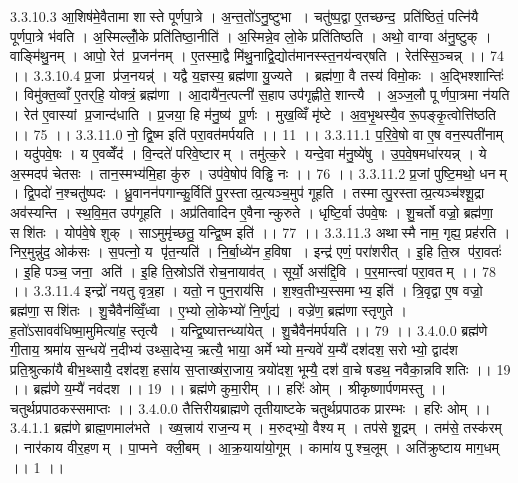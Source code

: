 3.3.10.3
आ॒शिष॑मे॒वैतामा शास्ते पूर्णपा॒त्रे । अ॒न्त॒तो॑ऽनु॒ष्टुभा । चतु॑ष्प॒द्वा ए॒तच्छन्द॒ प्रति॑ष्ठितं॒ पत्नि॑यै पूर्णपा॒त्रे भ॑वति । अ॒स्मिल्लोँ॒के प्रति॑तिष्ठा॒नीति॑ । अ॒स्मिन्ने॒व लो॒के प्रति॑तिष्ठति । अथो॒ वाग्वा अ॑नु॒ष्टुक् । वाङ्मि॑थु॒नम् । आपो॒ रेत॑ प्र॒जन॑नम् । ए॒तस्मा॒द्वै मि॑थु॒नाद्वि॒द्योत॑मानस्स्त॒नय॑न्वर्‌षति । रेत॑स्सि॒ञ्चन्न् ।। 74 ।।
3.3.10.4
प्र॒जा प्र॑ज॒नयन्न्॑ । यद्वै य॒ज्ञस्य॒ ब्रह्म॑णा यु॒ज्यते । ब्रह्म॑णा॒ वै तस्य॑ विमो॒कः । अ॒द्भिश्शान्तिः॑ । विमु॑क्त॒व्वाँ ए॒तर्‌हि॒ योक्त्रं॒ ब्रह्म॑णा । आ॒दायै॑न॒त्पत्नी॑ स॒हाप उप॑गृह्णीते॒ शान्त्यै । अ॒ञ्ज॒लौ पूर्णपा॒त्रमा न॑यति । रेत॑ ए॒वास्यां प्र॒जान्द॑धाति । प्र॒जया॒ हि म॑नु॒ष्य॑ पू॒र्णः । मुख॒व्विँ मृ॑ष्टे । अ॒व॒भृ॒थस्यै॒व रू॒पङ्कृ॒त्वोत्ति॑ष्ठति ।। 75 ।।
3.3.11.0
नो॒ द्वि॒ष्म इति॑ परा॒वत॑मर्पयति ।। 11 ।।
3.3.11.1
प॒रि॒वे॒षो वा ए॒ष वन॒स्पती॑नाम् । यदु॑पवे॒षः । य ए॒वव्वेँद॑ । वि॒न्दते॑ परिवे॒ष्टारम् । तमु॑त्क॒रे । यन्दे॒वा म॑नु॒ष्ये॑षु । उ॒प॒वे॒षमधा॑रयन्न् । ये अ॒स्मदप॑ चेतसः । तान॒स्मभ्य॑मि॒हा कु॑रु । उप॑वे॒षोप॑ विड्ढि नः ।। 76 ।।
3.3.11.2
प्र॒जां पुष्टि॒मथो॒ धनम् । द्वि॒पदो॑ न॒श्चतु॑ष्पदः । ध्रु॒वानन॑पगान्कु॒र्विति॑ पु॒रस्तात्प्र॒त्यञ्च॒मुप॑ गूहति । तस्मात्पु॒रस्तात्प्र॒त्यञ्च॑श्शू॒द्रा अव॑स्यन्ति । स्थ॒वि॒म॒त उप॑गूहति । अप्र॑तिवादिन ए॒वैनान्कुरुते । धृष्टि॒र्वा उ॑पवे॒षः । शु॒चर्तो वज्रो॒ ब्रह्म॑णा॒ सशि॑तः । योप॑वे॒षे शुक् । साऽमुमृ॑च्छतु॒ यन्द्वि॒ष्म इति॑ ।। 77 ।।
3.3.11.3
अथास्मै नाम॒ गृह्य॒ प्रह॑रति । निर॒मुन्नु॑द॒ ओक॑सः । स॒पत्नो॒ य पृ॑त॒न्यति॑ । नि॒र्बा॒ध्ये॑न ह॒विषा । इन्द्र॑ एणं॒ परा॑शरीत् । इ॒हि ति॒स्र प॑रा॒वतः॑ । इ॒हि पञ्च॒ जना॒॒ अति॑ । इ॒हि ति॒स्रोऽति॑ रोच॒नायाव॑त् । सूर्यो॒ अस॑द्दि॒वि । प॒र॒मान्त्वा॑ परा॒वतम् ।। 78 ।।
3.3.11.4
इन्द्रो॑ नयतु वृत्र॒हा । यतो॒ न पुन॒राय॑सि । श॒श्व॒तीभ्य॒स्समाभ्य॒ इति॑ । त्रि॒वृद्वा ए॒ष वज्रो॒ ब्रह्म॑णा॒ सशि॑तः । शु॒चैवैन॑व्विँ॒ध्वा । ए॒भ्यो लो॒केभ्यो॑ नि॒र्णुद्य॑ । वज्रे॑ण॒ ब्रह्म॑णा स्तृणुते । ह॒तो॑ऽसावव॑धिष्मा॒मुमित्या॑ह॒ स्तृत्यै । यन्द्वि॒ष्यात्तन्ध्या॑येत् । शु॒चैवैन॑मर्पयति ।। 79 ।।
3.4.0.0
ब्रह्म॑णे गी॒ताय॒ श्रमा॑य स॒न्धये॑ न॒दीभ्य॑ उथ्सा॒देभ्य॒ ऋत्यै॒ भाया॒ अर्मेभ्यो म॒न्यवे॑ य॒म्यै॑ दश॑दश॒ सरोभ्यो॒ द्वाद॑श प्रति॒श्रुत्का॑यै बीभ॒थ्सायै॒ दश॑दश॒ हसा॑य स॒प्ताख्ष॑रा॒जाय॒ त्रयो॑दश॒ भूम्यै॒ दश॑ वा॒चे षडथ॒ नवैका॒न्नवि॑शतिः ।। 19 ।। ब्रह्म॑णे य॒म्यै॑ नव॑दश ।। 19 ।। ब्रह्म॑णे कुमा॒रीम् ।। हरिः॑ ओम् । श्रीकृष्णार्पणमस्तु ।। चतुर्थप्रपाठकस्समाप्तः ।।
3.4.0.0
तैत्तिरीयब्राह्मणे तृतीयाष्टके चतुर्थप्रपाठक प्रारम्भः । हरिः ओम् ।।
3.4.1.1
ब्रह्म॑णे ब्राह्म॒णमाल॑भते । ख्ष॒त्त्राय॑ राज॒न्यम् । म॒रुद्भ्यो॒ वैश्यम् । तप॑से शू॒द्रम् । तम॑से॒ तस्क॑रम् । नार॑काय वीर॒हणम् । पा॒प्मने क्ली॒बम् । आ॒क्र॒याया॑यो॒गूम् । कामा॑य पुश्च॒लूम् । अति॑क्रुष्टाय माग॒धम् ।। 1 ।।
